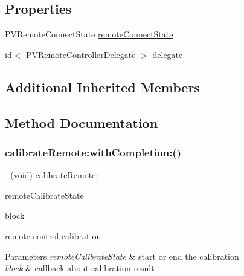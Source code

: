 \subsection*{Properties}
\begin{DoxyCompactItemize}
\item 
P\+V\+Remote\+Connect\+State \hyperlink{interface_p_v_remote_controller_ac44e638ddad2e2ec1b5d8f1f99998308}{remote\+Connect\+State}
\item 
id$<$ P\+V\+Remote\+Controller\+Delegate $>$ \hyperlink{interface_p_v_remote_controller_adf6bba42ff7feddd27a36eb8d060826e}{delegate}
\end{DoxyCompactItemize}
\subsection*{Additional Inherited Members}


\subsection{Method Documentation}
\mbox{\label{interface_p_v_remote_controller_a78de735d1a6d9425a2a405a1408dbc07}} 
\subsubsection{\texorpdfstring{calibrate\+Remote\+:with\+Completion\+:()}{calibrateRemote:withCompletion:()}}
{\footnotesize\ttfamily -\/ (void) calibrate\+Remote\+: \begin{DoxyParamCaption}\item[{(P\+V\+Remote\+Calibrate\+State)}]{remote\+Calibrate\+State }\item[{withCompletion:(void($^\wedge$)(P\+V\+Romote\+Calibrate\+State state, N\+S\+Error $\ast$\hyperlink{group___p_v_s_d_k___c_o_r_e___a_p_i___m_o_u_n_t_c_o_n_t_r_o_l_ga5a1de33b230662127568783314b4a54d}{\+\_\+\+Nullable} error))}]{block }\end{DoxyParamCaption}}

remote control calibration


\begin{DoxyParams}{Parameters}
{\em remote\+Calibrate\+State} & start or end the calibration \\
\hline
{\em block} & callback about calibration result \\
\hline
\end{DoxyParams}
\mbox{\label{interface_p_v_remote_controller_a0a631aec990e18e524511ba231eb6c9d}} 
